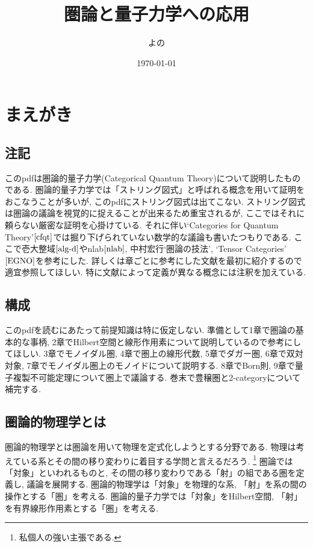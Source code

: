 \documentclass[a4paper,12pt]{ltjsarticle}
\title{圏論と量子力学への応用}
\author{よの}
\date{\today}
\theoremstyle{break}
\numberwithin{equation}{section}
\begin{document}
\maketitle

\newpage

\section*{まえがき}

\subsection*{注記}

このpdfは圏論的量子力学(Categorical Quantum Theory)について説明したものである. 
圏論的量子力学では「ストリング図式」と呼ばれる概念を用いて証明をおこなうことが多いが, このpdfにストリング図式は出てこない. 
ストリング図式は圏論の議論を視覚的に捉えることが出来るため重宝されるが, ここではそれに頼らない厳密な証明を心掛けている.  
それに伴い`Categories for Quantum Theory'$\cite{cfqt}$では掘り下げられていない数学的な議論も書いたつもりである. 
ここで壱大整域$\cite{alg-d}$やnlab$\cite{nlab}$, 中村宏行`圏論の技法'\cite{gihou}, `Tensor Categories'$\cite{EGNO}$を参考にした. 
詳しくは章ごとに参考にした文献を最初に紹介するので適宜参照してほしい. 
特に文献によって定義が異なる概念には注釈を加えている. 

\subsection*{構成}

このpdfを読むにあたって前提知識は特に仮定しない. 
準備として1章で圏論の基本的な事柄, 2章でHilbert空間と線形作用素について説明しているので参考にしてほしい.  
3章でモノイダル圏, 4章で圏上の線形代数, 5章でダガー圏, 6章で双対対象, 7章でモノイダル圏上のモノイドについて説明する. 
8章でBorn則, 9章で量子複製不可能定理について圏上で議論する. 
巻末で豊穣圏と2-categoryについて補完する. 

\subsection*{圏論的物理学とは}

圏論的物理学とは圏論を用いて物理を定式化しようとする分野である. 
物理は考えている系とその間の移り変わりに着目する学問と言えるだろう.
\footnote{
  私個人の強い主張である. 
}
圏論では「対象」といわれるものと, その間の移り変わりである「射」の組である圏を定義し, 議論を展開する. 
圏論的物理学は「対象」を物理的な系, 「射」を系の間の操作とする「圏」を考える. 
圏論的量子力学では「対象」をHilbert空間, 「射」を有界線形作用素とする「圏」を考える. 
\end{document}
